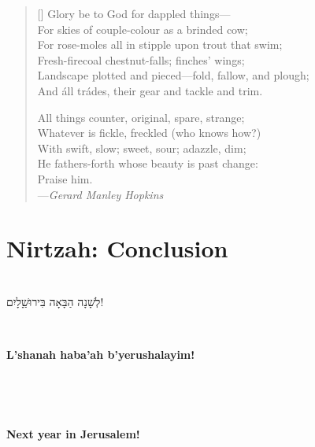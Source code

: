 \documentclass[a4paper,10pt,openany]{memoir}
\newcommand{\HgInst}[1]{{\noindent\sffamily{\bfseries{#1}}}}
\newcommand{\HgSource}[1]{\hfill{\small---\itshape{#1}}}
\newcommand{\HgHL}[1]{{\Large\bfseries#1\par\noindent\\[-.5em]}}
\newcommand{\HgFill}{\vfill \hrule \vfill}
\newenvironment{HgEnglish}{\strut\\\noindent}{\vspace{1em}}
\newenvironment{HgTranslit}{\strut\\\noindent\begin{itshape}}{\end{itshape}\vspace{1em}}
\newenvironment{HgHebrew}{\begin{hebrew}\strut\\\noindent\Large}{\end{hebrew}}
\begin{document}
\vspace{-2em}
\settowidth{\versewidth}{Landscape plotted and pieced---fold, fallow and plough;}
\begin{verse}[\versewidth]
Glory be to God for dappled things--- \\
\vin  For skies of couple-colour as a brinded cow; \\
\vin \vin    For rose-moles all in stipple upon trout that swim; \\
Fresh-firecoal chestnut-falls; finches’ wings; \\
\vin  Landscape plotted and pieced---fold, fallow, and plough; \\
\vin \vin    And \'{a}ll tr\'{a}des, their gear and tackle and trim. 
 
All things counter, original, spare, strange; \\
\vin  Whatever is fickle, freckled (who knows how?) \\
\vin \vin    With swift, slow; sweet, sour; adazzle, dim; \\
He fathers-forth whose beauty is past change: \\
\vin \vin \vin                  Praise him.\\
\HgSource{Gerard Manley Hopkins}
\end{verse}

\chapter*{Nirtzah: Conclusion}

\vfill

\begin{HgHebrew}
  לְשָׁנָה הַבָּאָה בִּירוּשַָׁלָיִם!
  \vspace{-1em}
\end{HgHebrew}

\begin{HgTranslit}
  \HgHL{L'shanah haba'ah b'yerushalayim!}
  \vspace{-3em}
\end{HgTranslit}

\begin{HgEnglish}
  \HgHL{Next year in Jerusalem!}
\end{HgEnglish}

\HgInst{Sing!}
\end{document}
